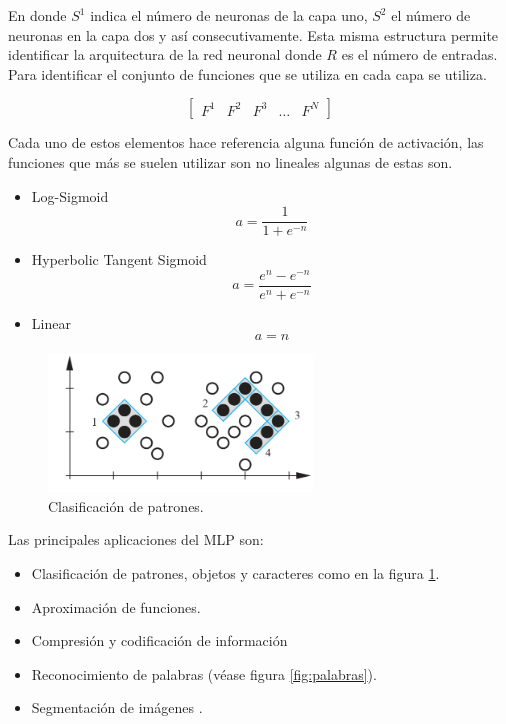 En donde $S^1$ indica el número de neuronas de la capa uno, $S^2$ el número de neuronas en la capa dos y así consecutivamente. Esta misma estructura permite identificar la arquitectura de la red neuronal donde $R$ es el número de entradas. Para identificar el conjunto de funciones que se utiliza en cada capa se utiliza.

\[ \begin{bmatrix} F^1 & F^2 & F^3 & \dots & F^N \end{bmatrix} \]


Cada uno de estos elementos hace referencia alguna función de activación, las funciones que más se suelen utilizar son no lineales algunas de estas son.

\begin{itemize}
    \item Log-Sigmoid
    \[ a = \dfrac{1}{1+e^{-n}}\]
    \item Hyperbolic Tangent Sigmoid
    \[ a = \dfrac{e^n - e^{-n}}{e^n + e^{-n}}\]
    \item Linear
    \[ a = n\]
\end{itemize}

\begin{figure}[H]
    \begin{center}
        \includegraphics[width=7cm]{img/patrones.png}
        \caption{Clasificación de patrones. \cite{libro1}}
        \label{fig:clasificacion}
    \end{center}
\end{figure}

Las principales aplicaciones del MLP son:
\begin{itemize}
    \item Clasificación de patrones, objetos y caracteres como en la figura \ref{fig:clasificacion}.
    \item Aproximación de funciones.
    \item Compresión y codificación de información
    \item Reconocimiento de palabras (véase figura \ref{fig:palabras}).
    \item Segmentación de imágenes \cite{pdf}.
\end{itemize}

